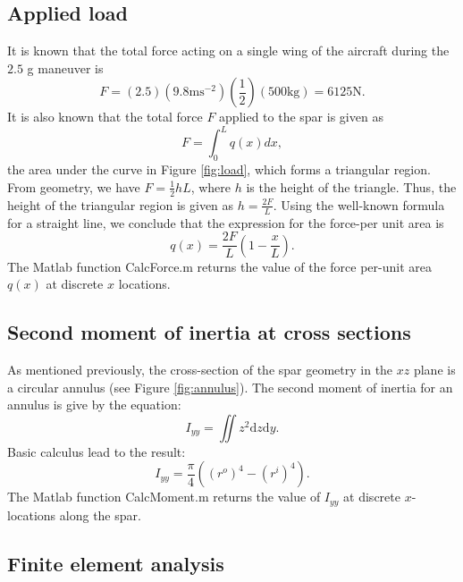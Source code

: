 \documentclass[11pt]{article}
\begin{document}
\subsection{Applied load}

It is known that the total force acting on a single wing
of the aircraft during the $2.5$ g maneuver is
\begin{equation}
F = (2.5)(9.8 \text{m}\text{s}^{-2})(\frac12)(500 \text{kg}) = 6125 \text{N}.
\end{equation}
It is also known that the total force $F$ applied to the
spar is given as
\begin{equation}
F = \int_0 ^L q(x) dx,
\end{equation}
the area under the curve in Figure \ref{fig:load}, which
forms a triangular region. From geometry, we have $F = \frac12 h L$,
where $h$ is the height of the triangle. Thus, the height
of the triangular region is given as $h = \frac{2F}{L}$.
Using the well-known formula for a straight line, we conclude that
the expression for the force-per unit area is
\begin{equation}
q(x) = \frac{2F}{L} \left( 1 - \frac{x}{L} \right).
\end{equation}
The Matlab function CalcForce.m returns the value
of the force per-unit area $q(x)$ at discrete $x$
locations.

\subsection{Second moment of inertia at cross sections}

As mentioned previously, the cross-section of the spar
geometry in the $xz$ plane is a circular annulus
(see Figure \ref{fig:annulus}). The second moment
of inertia for an annulus is give by the equation:
\begin{equation}
I_{yy} = \iint z^2 \text{d} z \text{d} y.
\end{equation}
Basic calculus lead to the result:
\begin{equation}
I_{yy} = \frac{\pi}{4} \left ( (r^o)^4 - (r^i)^4 \right).
\end{equation}
The Matlab function CalcMoment.m returns the value
of $I_{yy}$ at discrete $x$-locations along the spar.

\subsection{Finite element analysis}
\end{document}
